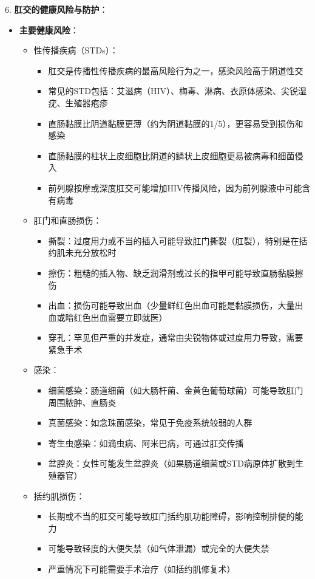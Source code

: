 \documentclass[12pt,UTF8]{ctexbook}
\begin{document}
6. \textbf{肛交的健康风险与防护}：
\begin{itemize}
	\item \textbf{主要健康风险}：
	\begin{itemize}
		\item 性传播疾病（STDs）：
		\begin{itemize}
			\item 肛交是传播性传播疾病的最高风险行为之一，感染风险高于阴道性交
			\item 常见的STD包括：艾滋病（HIV）、梅毒、淋病、衣原体感染、尖锐湿疣、生殖器疱疹
			\item 直肠黏膜比阴道黏膜更薄（约为阴道黏膜的1/5），更容易受到损伤和感染
			\item 直肠黏膜的柱状上皮细胞比阴道的鳞状上皮细胞更易被病毒和细菌侵入
			\item 前列腺按摩或深度肛交可能增加HIV传播风险，因为前列腺液中可能含有病毒
		\end{itemize}
		\item 肛门和直肠损伤：
		\begin{itemize}
			\item 撕裂：过度用力或不当的插入可能导致肛门撕裂（肛裂），特别是在括约肌未充分放松时
			\item 擦伤：粗糙的插入物、缺乏润滑剂或过长的指甲可能导致直肠黏膜擦伤
			\item 出血：损伤可能导致出血（少量鲜红色出血可能是黏膜损伤，大量出血或暗红色出血需要立即就医）
			\item 穿孔：罕见但严重的并发症，通常由尖锐物体或过度用力导致，需要紧急手术
		\end{itemize}
		\item 感染：
		\begin{itemize}
			\item 细菌感染：肠道细菌（如大肠杆菌、金黄色葡萄球菌）可能导致肛门周围脓肿、直肠炎
			\item 真菌感染：如念珠菌感染，常见于免疫系统较弱的人群
			\item 寄生虫感染：如滴虫病、阿米巴病，可通过肛交传播
			\item 盆腔炎：女性可能发生盆腔炎（如果肠道细菌或STD病原体扩散到生殖器官）
		\end{itemize}
		\item 括约肌损伤：
		\begin{itemize}
			\item 长期或不当的肛交可能导致肛门括约肌功能障碍，影响控制排便的能力
			\item 可能导致轻度的大便失禁（如气体泄漏）或完全的大便失禁
			\item 严重情况下可能需要手术治疗（如括约肌修复术）

\end{itemize}
\end{itemize}
\end{itemize}
\end{document}
